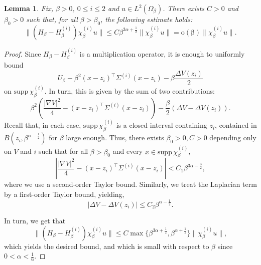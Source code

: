 \documentclass[10pt]{article}
\newcommand{\1}{\mathbbm 1}
\newtheorem{lemma}{Lemma}
\begin{document}
    \begin{lemma}
        Fix, $\beta>0$, $0\leq i \leq 2$ and $u\in L^2(\Omega_\beta)$.
        There exists $C>0$ and $\beta_0>0$ such that, for all $\beta>\beta_0$, the following estimate holds:
        \begin{equation}
            \label{eq:taylor_bound_witten}
            \|(H_\beta-H_\beta^{(i)})\chi_\beta^{(i)} u\| \leq C\beta^{3\alpha+\frac12}\|\chi_\beta^{(i)}u\| = \mathrm{o(\beta)}\|\chi_\beta^{(i)}u\|.
        \end{equation}
    \end{lemma}
    \begin{proof}
        Since $H_\beta-H_\beta^{(i)}$ is a multiplication operator, it is enough to uniformly bound
        $$U_\beta - \beta^2(x-z_i)^\intercal \Sigma^{(i)}(x-z_i) - \beta \frac{\Delta V(z_i)}2$$ on $\mathrm{supp}\,\chi_\beta^{(i)}$.
        In turn, this is given by the sum of two contributions:
        $$ \beta^2\left(\frac{|\nabla V|^2}4 - (x-z_i)^\intercal \Sigma^{(i)}(x-z_i) \right) - \frac\beta2(\Delta V - \Delta V(z_i)).$$
        Recall that, in each case, $\mathrm{supp}\,\chi_\beta^{(i)}$ is a closed interval containing $z_i$, contained in $B(z_i,\beta^{\alpha-\frac12})$ for $\beta$ large enough. 
        Thus, there exists $\beta_0>0, C>0$ depending only on $V$ and $i$ such that for all $\beta>\beta_0$ and every $x\in \mathrm{supp}\,\chi_\beta^{(i)}$, 
        $$\left|\frac{|\nabla V|^2}4 - (x-z_i)^\intercal \Sigma^{(i)}(x-z_i)\right| < C_1 \beta^{3\alpha-\frac32},$$
        where we use a second-order Taylor bound. Similarly, we treat the Laplacian term by a first-order Taylor bound, yielding,
        $$ \left| \Delta V - \Delta V(z_i)\right| \leq C_2 \beta^{\alpha-\frac12}.$$

        In turn, we get that 
        $$\|(H_\beta-H_\beta^{(i)})\chi_\beta^{(i)} u\| \leq C\max\{\beta^{3\alpha+\frac12},\beta^{\alpha+\frac12}\}\|\chi_\beta^{(i)}u\|,$$
        which yields the desired bound, and which is small with respect to $\beta$ since $0<\alpha<\frac16$.

    \end{proof}
\end{document}
